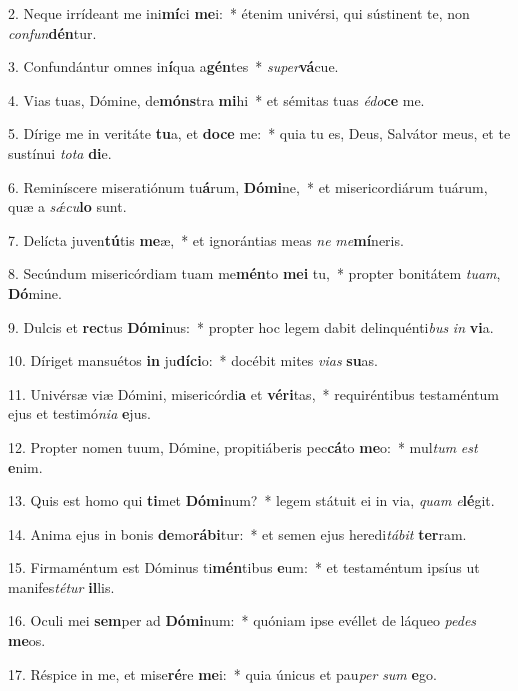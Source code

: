 2. Neque irrídeant me ini\textbf{mí}ci \textbf{me}i:~*  étenim univérsi, qui sústinent te, non \textit{con}\textit{fun}\textbf{dén}tur.\

3. Confundántur omnes in\textbf{í}qua a\textbf{gén}tes~*  \textit{su}\textit{per}\textbf{vá}cue.\

4. Vias tuas, Dómine, de\textbf{móns}tra \textbf{mi}hi~*  et sémitas tuas \textit{é}\textit{do}\textbf{ce} me.\

5. Dírige me in veritáte \textbf{tu}a, et \textbf{do}\textbf{ce} me:~*  quia tu es, Deus, Salvátor meus, et te sustínui \textit{to}\textit{ta} \textbf{di}e.\

6. Reminíscere miseratiónum tu\textbf{á}rum, \textbf{Dó}\textbf{mi}ne,~*  et misericordiárum tuárum, quæ a \textit{sǽ}\textit{cu}\textbf{lo} sunt.\

7. Delícta juven\textbf{tú}tis \textbf{me}æ,~*  et ignorántias meas \textit{ne} \textit{me}\textbf{mí}neris.\

8. Secúndum misericórdiam tuam me\textbf{mén}to \textbf{me}\textbf{i} tu,~*  propter bonitátem \textit{tu}\textit{am}, \textbf{Dó}mine.\

9. Dulcis et \textbf{rec}tus \textbf{Dó}\textbf{mi}nus:~*  propter hoc legem dabit delinquénti\textit{bus} \textit{in} \textbf{vi}a.\

10. Díriget mansuétos \textbf{in} ju\textbf{dí}\textbf{ci}o:~*  docébit mites \textit{vi}\textit{as} \textbf{su}as.\

11. Univérsæ viæ Dómini, misericórdi\textbf{a} et \textbf{vé}\textbf{ri}tas,~*  requiréntibus testaméntum ejus et testimó\textit{ni}\textit{a} \textbf{e}jus.\

12. Propter nomen tuum, Dómine, propitiáberis pec\textbf{cá}to \textbf{me}o:~*  mul\textit{tum} \textit{est} \textbf{e}nim.\

13. Quis est homo qui \textbf{ti}met \textbf{Dó}\textbf{mi}num?~*  legem státuit ei in via, \textit{quam} \textit{e}\textbf{lé}git.\

14. Anima ejus in bonis \textbf{de}mo\textbf{rá}\textbf{bi}tur:~*  et semen ejus heredi\textit{tá}\textit{bit} \textbf{ter}ram.\

15. Firmaméntum est Dóminus ti\textbf{mén}tibus \textbf{e}um:~*  et testaméntum ipsíus ut manifes\textit{té}\textit{tur} \textbf{il}lis.\

16. Oculi mei \textbf{sem}per ad \textbf{Dó}\textbf{mi}num:~*  quóniam ipse evéllet de láqueo \textit{pe}\textit{des} \textbf{me}os.\

17. Réspice in me, et mise\textbf{ré}re \textbf{me}i:~*  quia únicus et pau\textit{per} \textit{sum} \textbf{e}go.\


